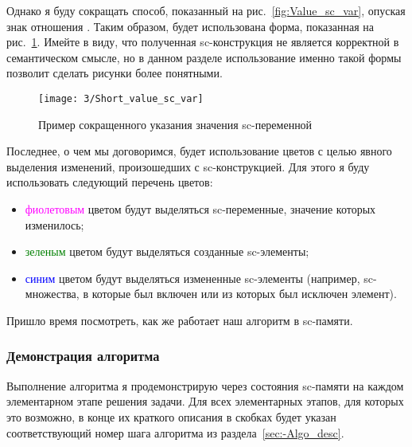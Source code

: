 Однако я буду сокращать способ, показанный на
рис.~\ref{fig:Value_sc_var}, опуская знак отношения
. Таким образом, будет использована форма, показанная на
рис.~\ref{fig:Short_value_sc_var}. Имейте в виду, что полученная
sc-конструкция не является корректной в семантическом смысле, но в
данном разделе использование именно такой формы позволит сделать
рисунки более понятными.

\begin{figure}[h!]
  \centering
  \texttt{[image: 3/Short\_value\_sc\_var]}
  \caption{Пример сокращенного указания значения sc-переменной
    }
  \label{fig:Short_value_sc_var}
\end{figure}

Последнее, о чем мы договоримся, будет использование цветов с целью
явного выделения изменений, произошедших с sc-конструкцией. Для этого
я буду использовать следующий перечень цветов:

\begin{itemize}
\item \textcolor{magenta}{фиолетовым} цветом будут выделяться sc-переменные, значение
  которых изменилось;
\item \textcolor{green}{зеленым} цветом будут выделяться созданные sc-элементы;
\item \textcolor{blue}{синим} цветом будут выделяться измененные sc-элементы (например,
  sc-множества, в которые был включен или из которых был исключен
  элемент).
\end{itemize}

Пришло время посмотреть, как же работает наш алгоритм в sc-памяти.

\subsubsection{Демонстрация алгоритма}

Выполнение алгоритма я продемонстрирую через состояния sc-памяти на
каждом элементарном этапе решения задачи. Для всех элементарных
этапов, для которых это возможно, в конце их краткого описания в
скобках будет указан соответствующий номер шага алгоритма из
раздела~\ref{sec:-Algo_desc}.

\newenvironment{algostep}[3]
{
  \newpage
  \emph{\textbf{#1}}

  \begin{figure}[h!]
    \centering
    \texttt{[image: 3/\#2]}
    \label{fig:#2}
  \end{figure}
}
{
}

